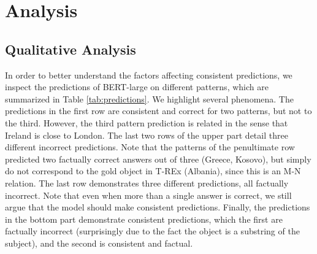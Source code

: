 \section{Analysis}
\label{sec:analysis}










\subsection{Qualitative Analysis}
In order to better understand the factors affecting consistent predictions, we inspect the predictions of BERT-large on different patterns, which are summarized in Table \ref{tab:predictions}.
We highlight several phenomena.
The predictions in the first row are consistent and correct for two patterns, but not to the third. However, the third pattern prediction is related in the sense that Ireland is close to London.
The last two rows of the upper part detail three different incorrect predictions. Note that the patterns of the penultimate row predicted two factually correct answers out of three (Greece, Kosovo), but simply do not correspond to the gold object in T-REx (Albania), since this is an M-N relation. The last row demonstrates three different predictions, all factually incorrect. Note that even when more than a single answer is correct, we still argue that the model should make consistent predictions.
Finally, the predictions in the bottom part demonstrate consistent predictions, which the first are factually incorrect (surprisingly due to the fact the object is a substring of the subject), and the second is consistent and factual.





